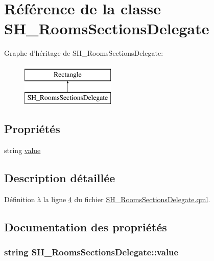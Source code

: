 \hypertarget{classSH__RoomsSectionsDelegate}{\section{Référence de la classe S\-H\-\_\-\-Rooms\-Sections\-Delegate}
\label{classSH__RoomsSectionsDelegate}
}
Graphe d'héritage de S\-H\-\_\-\-Rooms\-Sections\-Delegate\-:\begin{figure}[H]
\begin{center}
\leavevmode
\includegraphics[height=2.000000cm]{classSH__RoomsSectionsDelegate}
\end{center}
\end{figure}
\subsection*{Propriétés}
\begin{DoxyCompactItemize}
\item 
string \hyperlink{classSH__RoomsSectionsDelegate_a4d550c8d2c0adc9c76ae6d2a4e5a6acd}{value}
\end{DoxyCompactItemize}


\subsection{Description détaillée}


Définition à la ligne \hyperlink{SH__RoomsSectionsDelegate_8qml_source_l00004}{4} du fichier \hyperlink{SH__RoomsSectionsDelegate_8qml_source}{S\-H\-\_\-\-Rooms\-Sections\-Delegate.\-qml}.



\subsection{Documentation des propriétés}
\hypertarget{classSH__RoomsSectionsDelegate_a4d550c8d2c0adc9c76ae6d2a4e5a6acd}{
\subsubsection[{value}]{\setlength{\rightskip}{0pt plus 5cm}string S\-H\-\_\-\-Rooms\-Sections\-Delegate\-::value}}\label{classSH__RoomsSectionsDelegate_a4d550c8d2c0adc9c76ae6d2a4e5a6acd}


